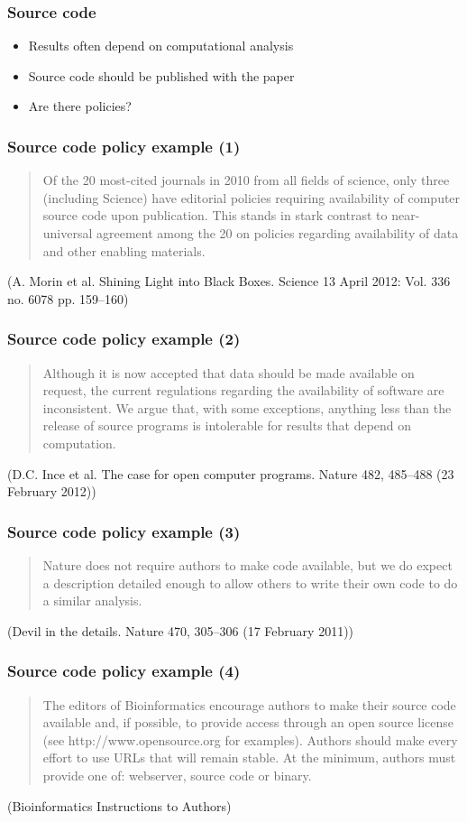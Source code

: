 \documentclass[slidestop]{beamer}
\begin{document}
\begin{frame}
  \frametitle{Source code}
  \begin{itemize}[<+->]
    \item Results often depend on computational analysis
    \item Source code should be published with the paper
    \item Are there policies?
  \end{itemize}
\end{frame}

\begin{frame}
  \frametitle{Source code policy example (1)}
  \begin{quote}
    Of the 20 most-cited journals in 2010 from all fields of science, only
    three (including Science) have editorial policies requiring
    availability of computer source code upon publication. This stands in stark
    contrast to near-universal agreement among the 20 on policies regarding
    availability of data and other enabling materials.
  \end{quote}
  (A. Morin et al. Shining Light into Black Boxes. Science 13 April 2012:
  Vol. 336 no. 6078 pp. 159--160)
\end{frame}

\begin{frame}
  \frametitle{Source code policy example (2)}
  \begin{quote}
    Although it is now accepted that data should be made available on
    request, the current regulations regarding the availability of software
    are inconsistent. We argue that, with some exceptions, anything less than
    the release of source programs is intolerable for results that depend on
    computation.
  \end{quote}
  (D.C. Ince et al. The case for open computer programs. Nature 482, 485--488
  (23 February 2012))
\end{frame}

\begin{frame}
  \frametitle{Source code policy example (3)}
  \begin{quote}
    Nature does not require authors to make code available, but we do
    expect a description detailed enough to allow others to write their
    own code to do a similar analysis.
  \end{quote}
  (Devil in the details. Nature 470, 305--306 (17 February 2011))
\end{frame}

\begin{frame}
  \frametitle{Source code policy example (4)}
  \begin{quote}
    The editors of Bioinformatics encourage authors to make their source
    code available and, if possible, to provide access through an open source
    license (see http://www.opensource.org for examples). Authors should make
    every effort to use URLs that will remain stable. At the minimum, authors
    must provide one of: webserver, source code or binary.
  \end{quote}
  (Bioinformatics Instructions to Authors)
\end{frame}
\end{document}
